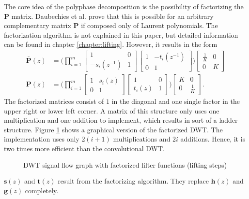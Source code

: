 \begin{refsection}
The core idea of the polyphase decomposition is the possibility of factorizing the $\bm P$ matrix.
Daubechies et al. prove that this is possible for an arbitrary complementary matrix $\bm P$ if composed only of Laurent polynomials.
The factorization algorithm is not explained in this paper, but detailed information can be found in chapter \ref{chapter:lifting}.
However, it results in the form
\begin{align}
	\bm{\bar P}(z) &=
	\Biggl(
	\prod_{i=1}^{m}
	\begin{bmatrix}
		1 & 0 \\
		-s_i(z^{-1}) & 1
	\end{bmatrix}
	\begin{bmatrix}
		1 & -t_i(z^{-1}) \\
		0 & 1
	\end{bmatrix}
	\Biggr)
	\begin{bmatrix}
		\frac{1}{K} & 0 \\
		0 & K
	\end{bmatrix}
	\\
	\bm P(z) &=
	\Biggl(
	\prod_{i=1}^{m}
	\begin{bmatrix}
		1 & s_i(z) \\
		0 & 1
	\end{bmatrix}
	\begin{bmatrix}
		1 & 0 \\
		t_i(z) & 1
	\end{bmatrix}
	\Biggr)
	\begin{bmatrix}
		K & 0 \\
		0 & \frac{1}{K}
	\end{bmatrix}
	.
\end{align}
The factorized matrices consist of $1$ in the diagonal and one single factor in the upper right or lower left corner.
A matrix of this structure only uses one multiplication and one addition to implement, which results in sort of a ladder structure.
Figure \ref{fpga:fig:liftingStepFactorization} shows a graphical version of the factorized DWT.
The implementation uses only $2(i+1)$ multiplications and $2i$ additions.
Hence, it is two times more efficient than the convolutional DWT.
\begin{figure}
	\centering
	
	
	\caption{DWT signal flow graph with factorized filter functions (lifting steps)}
	\label{fpga:fig:liftingStepFactorization}
\end{figure}
$\bm s(z)$ and $\bm t(z)$ result from the factorizing algorithm.
They replace $\bm h(z)$ and $\bm g(z)$ completely.


\end{refsection}
